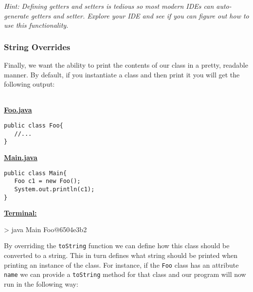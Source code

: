 \textit{Hint: Defining getters and setters is tedious so most modern IDEs can
auto-generate getters and setter. Explore your IDE and see if you can figure
out how to use this functionality.}

\subsubsection{String Overrides}

Finally, we want the ability to print the contents of our class in a pretty,
readable manner. By default, if you instantiate a class and then print it 
you will get the following output:\\
\vspace{0.2cm}\\

\begin{framed}
\begin{minipage}{0.25\textwidth}
\underline{\textbf{Foo.java}}
\begin{lstlisting}
public class Foo{
   //...
}
\end{lstlisting}
\end{minipage}
\hfill
\vline
\hfill
\begin{minipage}{0.32\textwidth}
\underline{\textbf{Main.java}}
\begin{lstlisting}
public class Main{
   Foo c1 = new Foo();
   System.out.println(c1);
}
\end{lstlisting}
\end{minipage}
\hfill
\vline
\hfill
\begin{minipage}{0.28\textwidth}
\underline{\textbf{Terminal:}}
\begin{shell}
> java Main
Foo@6504e3b2
\end{shell}
\end{minipage}
\end{framed}
\vspace{0.2cm}

By overriding the \lstinline|toString| function we can define how this class
should be converted to a string. This in turn defines what string should be
printed when printing an instance of the class. For instance, if the
\lstinline|Foo| class has an attribute \lstinline|name| we can provide a 
\lstinline|toString| method for that class and our program will now run
in the following way:\\
\vspace{0.2cm}\\

